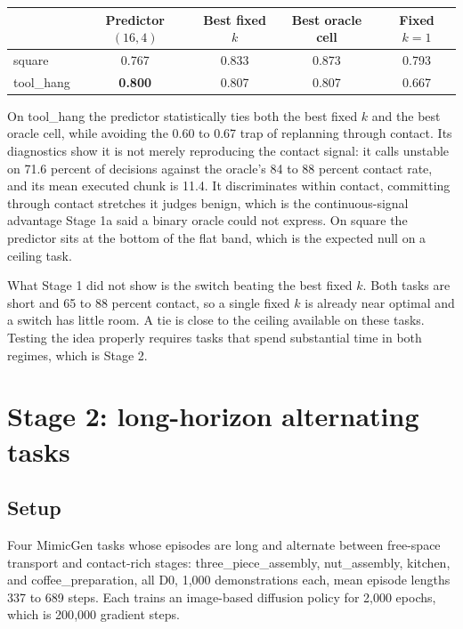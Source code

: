 \documentclass[11pt]{article}
\begin{document}
\begin{center}
\small
\begin{tabular}{@{}lcccc@{}}
\toprule
 & Predictor $(16,4)$ & Best fixed $k$ & Best oracle cell & Fixed $k{=}1$ \\
\midrule
square     & 0.767 & 0.833 & 0.873 & 0.793 \\
tool\_hang & \textbf{0.800} & 0.807 & 0.807 & 0.667 \\
\bottomrule
\end{tabular}
\end{center}

On tool\_hang the predictor statistically ties both the best fixed $k$ and the
best oracle cell, while avoiding the 0.60 to 0.67 trap of replanning through
contact. Its diagnostics show it is not merely reproducing the contact
signal: it calls unstable on 71.6 percent of decisions against the oracle's
84 to 88 percent contact rate, and its mean executed chunk is 11.4. It
discriminates within contact, committing through contact stretches it judges
benign, which is the continuous-signal advantage Stage 1a said a binary
oracle could not express. On square the predictor sits at the bottom of the
flat band, which is the expected null on a ceiling task.

What Stage 1 did not show is the switch beating the best fixed $k$. Both
tasks are short and 65 to 88 percent contact, so a single fixed $k$ is
already near optimal and a switch has little room. A tie is close to the
ceiling available on these tasks. Testing the idea properly requires tasks
that spend substantial time in both regimes, which is Stage 2.

\section{Stage 2: long-horizon alternating tasks}

\subsection{Setup}

Four MimicGen tasks whose episodes are long and alternate between free-space
transport and contact-rich stages: three\_piece\_assembly, nut\_assembly,
kitchen, and coffee\_preparation, all D0, 1{,}000 demonstrations each, mean
episode lengths 337 to 689 steps. Each trains an image-based diffusion policy
for 2{,}000 epochs, which is 200{,}000 gradient steps.
\end{document}
